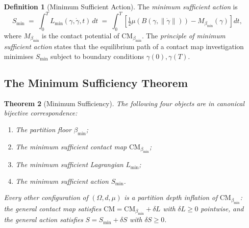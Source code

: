 \documentclass[12pt,a4paper,twocolumn]{article}
\theoremstyle{plain}
\newtheorem{theorem}{Theorem}[section]
\theoremstyle{definition}
\newtheorem{definition}[theorem]{Definition}
\theoremstyle{remark}
\newcommand{\CM}{\mathrm{CM}}
\newcommand{\bmin}{\beta_{\min}}
\newcommand{\Lmin}{L_{\min}}
\newcommand{\Smin}{S_{\min}}
\newcommand{\CMbmin}{\CM_{\bmin}}
\newcommand{\BRS}{(\Omega,d,\mu)}
\begin{document}
\begin{definition}[Minimum Sufficient Action]
\label{def:action}
The \emph{minimum sufficient action} is
\begin{equation}
  \Smin \;=\; \int_0^T \Lmin(\gamma, \dot\gamma, t)\, dt
    \;=\; \int_0^T \left[\tfrac{1}{2}\mu\!\left(B(\gamma,\|\dot\gamma\|)\right)
    - M_{\bmin}(\gamma)\right] dt,
\end{equation}
where $M_{\bmin}$ is the contact potential of $\CMbmin$.  The
\emph{principle of minimum sufficient action} states that the equilibrium
path of a contact map investigation minimises $\Smin$ subject to boundary
conditions $\gamma(0), \gamma(T)$.
\end{definition}

\subsection{The Minimum Sufficiency Theorem}

\begin{theorem}[Minimum Sufficiency]
\label{thm:minimum-sufficiency}
The following four objects are in canonical bijective correspondence:
\begin{enumerate}[label=(\Roman*)]
  \item The partition floor $\bmin$;
  \item The minimum sufficient contact map $\CMbmin$;
  \item The minimum sufficient Lagrangian $\Lmin$;
  \item The minimum sufficient action $\Smin$.
\end{enumerate}
Every other configuration of $\BRS$ is a partition depth inflation of
$\CMbmin$: the general contact map satisfies $\CM = \CMbmin + \delta L$
with $\delta L \geq 0$ pointwise, and the general action satisfies $S =
\Smin + \delta S$ with $\delta S \geq 0$.
\end{theorem}
\end{document}
